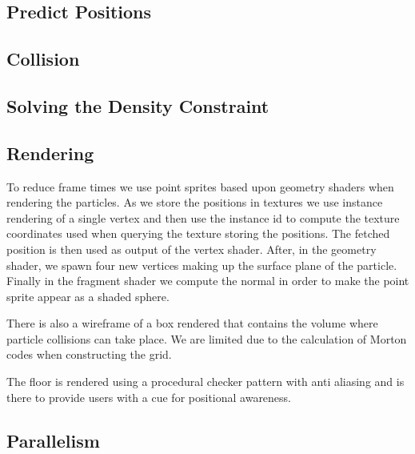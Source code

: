 

\subsection{Predict Positions}


\subsection{Collision}


\subsection{Solving the Density Constraint}


\subsection{Rendering} To reduce frame times we use point sprites based upon
geometry shaders when rendering the particles. As we store the positions in
textures we use instance rendering of a single vertex and then use the instance
id to compute the texture coordinates used when querying the texture storing
the positions. The fetched position is then used as output of the vertex
shader. After, in the geometry shader, we spawn four new vertices making up the
surface plane of the particle. Finally in the fragment shader we compute the
normal in order to make the point sprite appear as a shaded sphere.

There is also a wireframe of a box rendered that contains the volume where
particle collisions can take place. We are limited due to the calculation of
Morton codes when constructing the grid.

The floor is rendered using a procedural checker pattern with anti aliasing and
is there to provide users with a cue for positional awareness.


\subsection{Parallelism}

